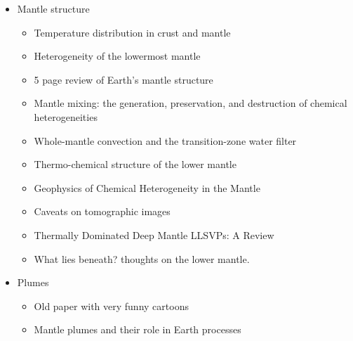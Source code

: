 \begin{itemize}
\item Mantle structure
   \begin{itemize}
   \item [\nineteeneightysix] Temperature distribution in crust and mantle \cite{jemo86}
   \item [\twothousand] Heterogeneity of the lowermost mantle \cite{garn00}
   \item [\twothousandone] 5 page review of Earth's mantle structure \cite{hewo01}
   \item [\twothousandtwo] Mantle mixing: the generation, preservation, and destruction of chemical heterogeneities \cite{vahb02}
   \item [\twothousandthree] Whole-mantle convection and the transition-zone water filter \cite{beka03}
   \item [\twothousandseven] Thermo-chemical structure of the lower mantle \cite{dett07}
   \item [\twothousandtwelve] Geophysics of Chemical Heterogeneity in the Mantle \cite{stli12}
   \item [\twothousandthirteen] Caveats on tomographic images \cite{fopa13}
   \item [\twothousandfifteen] Thermally Dominated Deep Mantle LLSVPs: A Review \cite{dagl15}
   \item [\twothousandnineteen] What lies beneath? thoughts on the lower mantle. \cite{hega19}
   \end{itemize}

\item Plumes
   \begin{itemize}
   \item[\nineteenseventyseven] Old paper with very funny cartoons \cite{hovo77}
   \item[\twothousandtwentyone] Mantle plumes and their role in Earth processes \cite{kobj21}
   \end{itemize}



\end{itemize}
